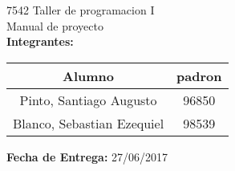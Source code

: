 \begin{titlepage}
    \vspace*{\fill}
    \begin{center}
        \Large 7542 Taller de programacion I \\
        \Huge Manual de proyecto\\
        \bigskip\bigskip\bigskip
        \large\textbf{Integrantes:} \\
        \begin{center}
            \begin{tabular}{||c | c||}
                \hline
                Alumno & padron \\ [0.5ex]
                \hline\hline
                Pinto, Santiago Augusto & 96850 \\
                \hline
                Blanco, Sebastian Ezequiel & 98539 \\
                \hline
            \end{tabular}
        \end{center}
        \textbf{Fecha de Entrega:} 27/06/2017\\

    \end{center}
    \vspace*{\fill}
\end{titlepage}
